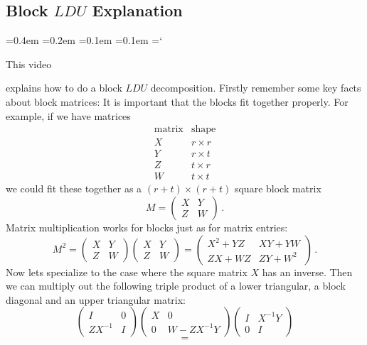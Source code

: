 
\subsection*{Block $LDU$ Explanation}

{\ttfamily
{}\font=0.4em
\font=0.2em
\font=0.1em
\font=0.1em
\hyphenchar\font=`\-


\hypertarget{scripts_lu_decomposition_blocks}{This video} explains how to do a block $LDU$ decomposition.
Firstly remember some key facts about block matrices: It is important that the blocks fit together properly.
For example, if we have matrices
$$
\begin{array}{c|c} \mbox{matrix}&\mbox{shape}\\\hline
X&r\times r\\
Y&r\times t\\
Z&t\times r\\
W& t\times t
\end{array}
$$
we could fit these together as a $(r+t)\times(r+t)$ square block matrix
$$
M=\left(\begin{array}{c|c}X&Y\\\hline Z&W\end{array}\right)\, .
$$
Matrix multiplication works for blocks just as for matrix entries:
$$
M^2 = \left(\begin{array}{c|c}X&Y\\\hline Z&W\end{array}\right)\left(\begin{array}{c|c}X&Y\\\hline Z&W\end{array}\right)
=\left(\begin{array}{c|c}X^2 + YZ&XY+YW\\\hline ZX+WZ&ZY+W^2\end{array}\right)\, .
$$
Now lets specialize to the case where the square matrix $X$ has an inverse. Then we can multiply out the following triple product of a lower triangular, a block diagonal and an
upper triangular matrix:
$$
\left(\begin{array}{c|c}I&0\\\hline ZX^{-1}&I\end{array}\right)\left(\begin{array}{c|c}X&0\\\hline 0&W-ZX^{-1}Y\end{array}\right)
\left(\begin{array}{c|c}I&X^{-1}Y\\\hline 0&I\end{array}\right)$$ $$=
$$}
